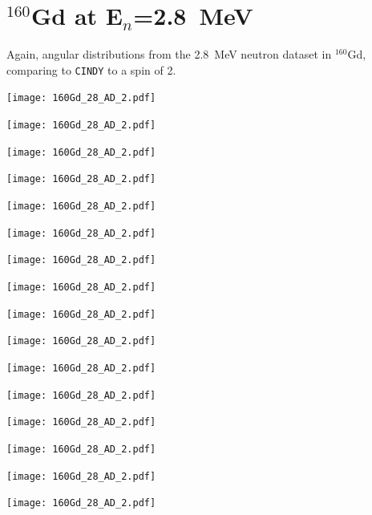 \section{$^{160}$Gd at E$_n$=2.8~MeV}\label{app:AD_Gd_28}%
Again, angular distributions from the 2.8~MeV neutron dataset in $^{160}$Gd, comparing to {\tt CINDY} to a spin of 2.
\begin{center}
\texttt{[image: 160Gd\_28\_AD\_2.pdf]}
\end{center}
\begin{center}
\texttt{[image: 160Gd\_28\_AD\_2.pdf]}
\end{center}
\begin{center}
\texttt{[image: 160Gd\_28\_AD\_2.pdf]}
\end{center}
\begin{center}
\texttt{[image: 160Gd\_28\_AD\_2.pdf]}
\end{center}
\begin{center}
\texttt{[image: 160Gd\_28\_AD\_2.pdf]}
\end{center}
\begin{center}
\texttt{[image: 160Gd\_28\_AD\_2.pdf]}
\end{center}
\begin{center}
\texttt{[image: 160Gd\_28\_AD\_2.pdf]}
\end{center}
\begin{center}
\texttt{[image: 160Gd\_28\_AD\_2.pdf]}
\end{center}
\begin{center}
\texttt{[image: 160Gd\_28\_AD\_2.pdf]}
\end{center}
\begin{center}
\texttt{[image: 160Gd\_28\_AD\_2.pdf]}
\end{center}
\begin{center}
\texttt{[image: 160Gd\_28\_AD\_2.pdf]}
\end{center}
\begin{center}
\texttt{[image: 160Gd\_28\_AD\_2.pdf]}
\end{center}
\begin{center}
\texttt{[image: 160Gd\_28\_AD\_2.pdf]}
\end{center}
\begin{center}
\texttt{[image: 160Gd\_28\_AD\_2.pdf]}
\end{center}
\begin{center}
\texttt{[image: 160Gd\_28\_AD\_2.pdf]}
\end{center}
\begin{center}
\texttt{[image: 160Gd\_28\_AD\_2.pdf]}
\end{center}
